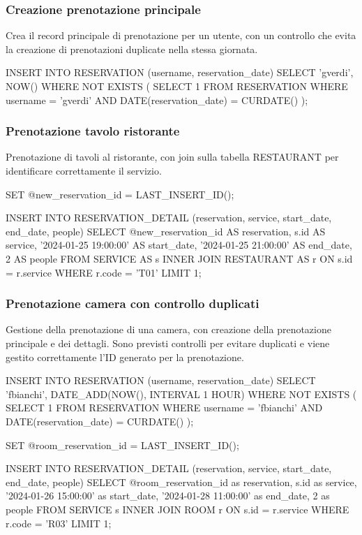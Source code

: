 \documentclass[a4paper,12pt]{report}
\begin{document}
\subsubsection{Creazione prenotazione principale}
Crea il record principale di prenotazione per un utente, con un
controllo che evita la creazione di prenotazioni duplicate nella
stessa giornata.

\begin{sqlcode}[caption={}]
INSERT INTO RESERVATION (username, reservation_date)
SELECT
  'gverdi',
  NOW()
WHERE NOT EXISTS (
  SELECT 1
  FROM RESERVATION
  WHERE
    username = 'gverdi'
    AND DATE(reservation_date) = CURDATE()
  );
\end{sqlcode}

\subsubsection{Prenotazione tavolo ristorante}
Prenotazione di tavoli al ristorante, con join sulla tabella
RESTAURANT per identificare correttamente il servizio.
\begin{sqlcode}[caption={}]
SET @new_reservation_id = LAST_INSERT_ID();

INSERT INTO RESERVATION_DETAIL (reservation, service, start_date, end_date, people)
SELECT
  @new_reservation_id AS reservation,
  s.id AS service,
  '2024-01-25 19:00:00' AS start_date,
  '2024-01-25 21:00:00' AS end_date,
  2 AS people
FROM SERVICE AS s
INNER JOIN RESTAURANT AS r ON s.id = r.service
WHERE r.code = 'T01'
LIMIT 1;
\end{sqlcode}

\newpage
\subsubsection{Prenotazione camera con controllo duplicati}
Gestione della prenotazione di una camera, con creazione della
prenotazione principale e dei dettagli. Sono previsti controlli per
evitare duplicati e viene gestito correttamente l'ID generato per la
prenotazione.

\begin{sqlcode}[caption={}]
INSERT INTO RESERVATION (username, reservation_date)
SELECT 'fbianchi', DATE_ADD(NOW(), INTERVAL 1 HOUR)
WHERE NOT EXISTS (
  SELECT 1 FROM RESERVATION
  WHERE username = 'fbianchi'
  AND DATE(reservation_date) = CURDATE()
);

SET @room_reservation_id = LAST_INSERT_ID();

INSERT INTO RESERVATION_DETAIL (reservation, service, start_date, end_date, people)
SELECT
  @room_reservation_id as reservation,
  s.id as service,
  '2024-01-26 15:00:00' as start_date,
  '2024-01-28 11:00:00' as end_date,
  2 as people
FROM SERVICE s
INNER JOIN ROOM r ON s.id = r.service
WHERE r.code = 'R03'
LIMIT 1;
\end{sqlcode}
\end{document}
